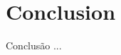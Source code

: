 \documentclass[12pt]{article}
\begin{document}
	\section{Conclusion}
		
	Conclusão ...
	
	
	
	
	
	
	
	
	\cite{Ferrer:2012}
	\cite{Bond:2015}
	\cite{Morris:2016}
	\cite{Fisher:2018}
	
	\nocite{Bond:2015}
	
	\newpage
		
	
	
\end{document}
